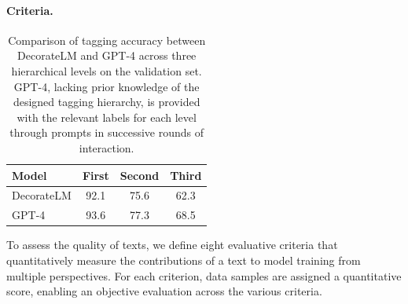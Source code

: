 \documentclass[11pt]{article}
\begin{document}
\paragraph{Criteria.}
\begin{table}
  \centering
  \begin{tabular}{lccc}
    \toprule
    \textbf{Model}      & \textbf{First} & \textbf{Second} & \textbf{Third} \\
    \midrule
    DecorateLM &         92.1             &       75.6                 &   62.3                    \\
    GPT-4      &          93.6             &        77.3               &          68.5             \\
    \bottomrule
  \end{tabular}
  \caption{\label{tab:taggingacc}
    Comparison of tagging accuracy between DecorateLM and GPT-4 across three hierarchical levels on the validation set. GPT-4, lacking prior knowledge of the designed tagging hierarchy, is provided with the relevant labels for each level through prompts in successive rounds of interaction.
  }
\end{table} 

To assess the quality of texts, we define eight evaluative criteria that quantitatively measure the contributions of a text to model training from multiple perspectives. 
For each criterion, data samples are assigned a quantitative score, enabling an objective evaluation across the various criteria. 
\end{document}
